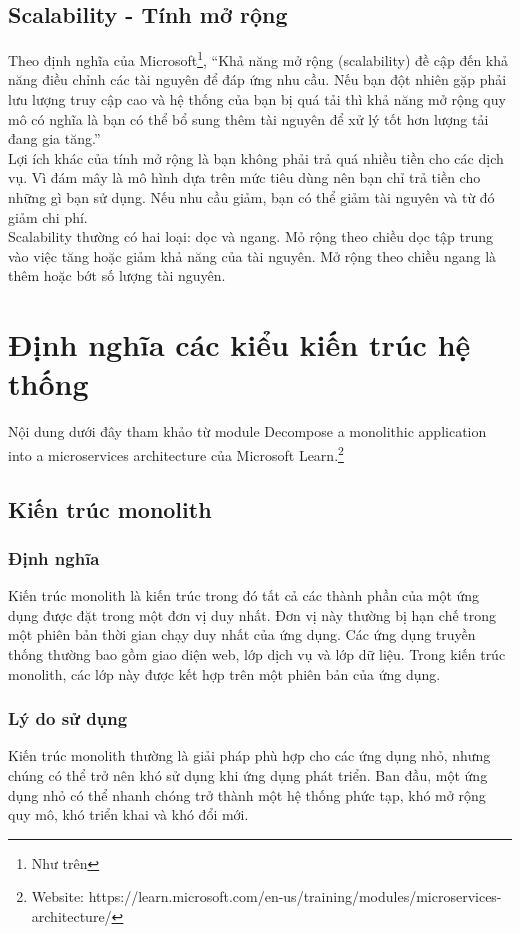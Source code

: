 \subsection{Scalability - Tính mở rộng}
\noindent Theo định nghĩa của Microsoft\footnote{Như trên}, “Khả năng mở rộng (scalability) đề cập đến khả năng điều chỉnh các tài nguyên để đáp ứng nhu cầu. Nếu bạn đột nhiên gặp phải lưu lượng truy cập cao và hệ thống của bạn bị quá tải thì khả năng mở rộng quy mô có nghĩa là bạn có thể bổ sung thêm tài nguyên để xử lý tốt hơn lượng tải đang gia tăng.” \\[0.5cm]
\noindent Lợi ích khác của tính mở rộng là bạn không phải trả quá nhiều tiền cho các dịch vụ. Vì đám mây là mô hình dựa trên mức tiêu dùng nên bạn chỉ trả tiền cho những gì bạn sử dụng. Nếu nhu cầu giảm, bạn có thể giảm tài nguyên và từ đó giảm chi phí. \\[0.5cm]
\noindent Scalability thường có hai loại: dọc và ngang. Mỏ rộng theo chiều dọc tập trung vào việc tăng hoặc giảm khả năng của tài nguyên. Mở rộng theo chiều ngang là thêm hoặc bớt số lượng tài nguyên.

\section{Định nghĩa các kiểu kiến trúc hệ thống}
\noindent Nội dung dưới đây tham khảo từ module Decompose a monolithic application into a microservices architecture của Microsoft Learn.\footnote{Website: https://learn.microsoft.com/en-us/training/modules/microservices-architecture/}
\subsection{Kiến trúc monolith}
\subsubsection{Định nghĩa}
\noindent Kiến trúc monolith là kiến trúc trong đó tất cả các thành phần của một ứng dụng được đặt trong một đơn vị duy nhất. Đơn vị này thường bị hạn chế trong một phiên bản thời gian chạy duy nhất của ứng dụng. Các ứng dụng truyền thống thường bao gồm giao diện web, lớp dịch vụ và lớp dữ liệu. Trong kiến trúc monolith, các lớp này được kết hợp trên một phiên bản của ứng dụng.
\subsubsection{Lý do sử dụng}
Kiến trúc monolith thường là giải pháp phù hợp cho các ứng dụng nhỏ, nhưng chúng có thể trở nên khó sử dụng khi ứng dụng phát triển. Ban đầu, một ứng dụng nhỏ có thể nhanh chóng trở thành một hệ thống phức tạp, khó mở rộng quy mô, khó triển khai và khó đổi mới.
